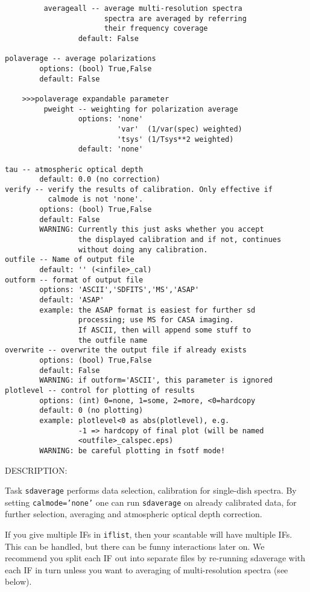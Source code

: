 \begin{verbatim}
         averageall -- average multi-resolution spectra
                       spectra are averaged by referring 
                       their frequency coverage
                 default: False

polaverage -- average polarizations
        options: (bool) True,False
        default: False

    >>>polaverage expandable parameter
         pweight -- weighting for polarization average
                 options: 'none'
                          'var'  (1/var(spec) weighted)
                          'tsys' (1/Tsys**2 weighted)
                 default: 'none'

tau -- atmospheric optical depth
        default: 0.0 (no correction)
verify -- verify the results of calibration. Only effective if 
          calmode is not 'none'.
        options: (bool) True,False
        default: False
        WARNING: Currently this just asks whether you accept
                 the displayed calibration and if not, continues
                 without doing any calibration. 
outfile -- Name of output file
        default: '' (<infile>_cal)
outform -- format of output file
        options: 'ASCII','SDFITS','MS','ASAP'
        default: 'ASAP'
        example: the ASAP format is easiest for further sd
                 processing; use MS for CASA imaging.
                 If ASCII, then will append some stuff to
                 the outfile name
overwrite -- overwrite the output file if already exists
        options: (bool) True,False
        default: False
        WARNING: if outform='ASCII', this parameter is ignored
plotlevel -- control for plotting of results
        options: (int) 0=none, 1=some, 2=more, <0=hardcopy
        default: 0 (no plotting)
        example: plotlevel<0 as abs(plotlevel), e.g.
                 -1 => hardcopy of final plot (will be named
                 <outfile>_calspec.eps)
        WARNING: be careful plotting in fsotf mode!
\end{verbatim}

DESCRIPTION:

Task {\tt sdaverage} performs data selection, calibration for single-dish
spectra.  By setting {\tt calmode='none'}
one can run {\tt sdaverage} on already calibrated data, for further selection, 
averaging and atmospheric optical depth correction.

If you give multiple IFs in {\tt iflist}, then your scantable will have
multiple IFs.  This can be handled, but there can be funny interactions
later on.  We recommend you split each IF out into separate files
by re-running sdaverage with each IF in turn unless you want to averaging of
multi-resolution spectra (see below).

